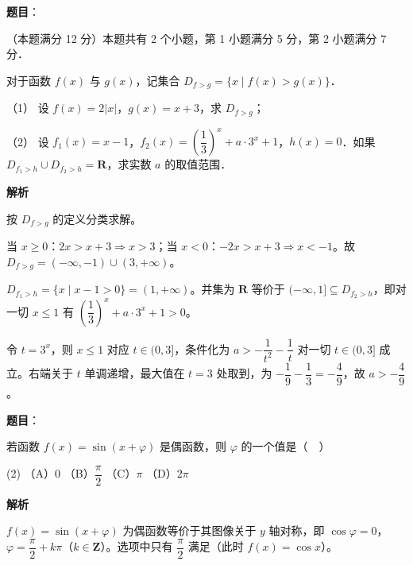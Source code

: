 \begin{answer}

\textbf{题目}：

（本题满分 12 分）本题共有 2 个小题，第 1 小题满分 5 分，第 2 小题满分 7 分．

对于函数 \(f(x)\) 与 \(g(x)\)，记集合 \(D_{f>g}=\{x\mid f(x)>g(x)\}\)．

（1） 设 \(f(x)=2|x|\)，\(g(x)=x+3\)，求 \(D_{f>g}\)；

（2） 设 \(f_{1}(x)=x-1\)，\(f_{2}(x)=\left(\dfrac{1}{3}\right)^{x}+a\cdot 3^{x}+1\)，\(h(x)=0\)．如果 \(D_{f_{1}>h}\cup D_{f_{2}>h}=\mathbf{R}\)，求实数 \(a\) 的取值范围．

\textbf{解析}

按 \(D_{f>g}\) 的定义分类求解。


当 \(x\geqslant 0\)：\(2x>x+3\Rightarrow x>3\)；当 \(x<0\)：\(-2x>x+3\Rightarrow x<-1\)。故 \(D_{f>g}=(-\infty,-1)\cup(3,+\infty)\)。


\(D_{f_{1}>h}=\{x\mid x-1>0\}=(1,+\infty)\)。并集为 \(\mathbf{R}\) 等价于 \((-\infty,1]\subseteq D_{f_{2}>h}\)，即对一切 \(x\leqslant 1\) 有 \(\left(\dfrac{1}{3}\right)^{x}+a\cdot 3^{x}+1>0\)。

令 \(t=3^{x}\)，则 \(x\leqslant 1\) 对应 \(t\in(0,3]\)，条件化为 \(a>-\dfrac{1}{t^{2}}-\dfrac{1}{t}\) 对一切 \(t\in(0,3]\) 成立。右端关于 \(t\) 单调递增，最大值在 \(t=3\) 处取到，为 \(-\dfrac{1}{9}-\dfrac{1}{3}=-\dfrac{4}{9}\)，故 \(a>-\dfrac{4}{9}\)。



\end{answer}
\begin{answer}

\textbf{题目}：

若函数 \(f(x)=\sin(x+\varphi)\) 是偶函数，则 \(\varphi\) 的一个值是（　）

\begin{gkopts}(2)
\task （A）0
\task （B）\(\dfrac{\pi}{2}\)
\task （C）\(\pi\)
\task （D）\(2\pi\)
\end{gkopts}

\textbf{解析}

\(f(x)=\sin(x+\varphi)\) 为偶函数等价于其图像关于 \(y\) 轴对称，即 \(\cos\varphi=0\)，\(\varphi=\dfrac{\pi}{2}+k\pi\)（\(k\in\mathbf{Z}\)）。选项中只有 \(\dfrac{\pi}{2}\) 满足（此时 \(f(x)=\cos x\)）。


\end{answer}
